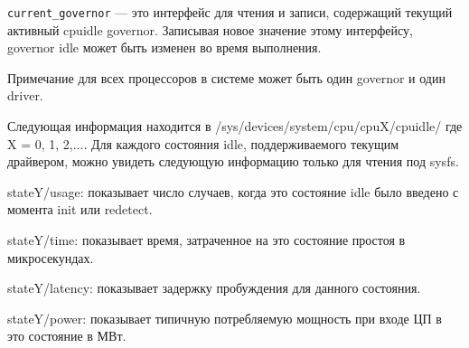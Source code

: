 \documentclass{article}
\begin{document}
\texttt{current\_governor} — это интерфейс для чтения и записи, содержащий текущий активный cpuidle governor. Записывая новое значение этому интерфейсу, governor idle может быть изменен во время выполнения.

Примечание для всех процессоров в системе может быть один governor и один driver.

Следующая информация находится в /sys/devices/system/cpu/cpuX/cpuidle/ где X = 0, 1, 2,.... Для каждого состояния idle, поддерживаемого текущим драйвером, можно увидеть следующую информацию только для чтения под sysfs.

stateY/usage: показывает число случаев, когда это состояние idle было введено с момента init или redetect.

stateY/time: показывает время, затраченное на это состояние простоя в микросекундах. 

stateY/latency: показывает задержку пробуждения для данного состояния.

stateY/power: показывает типичную потребляемую мощность при входе ЦП в это состояние в МВт.
\end{document}
